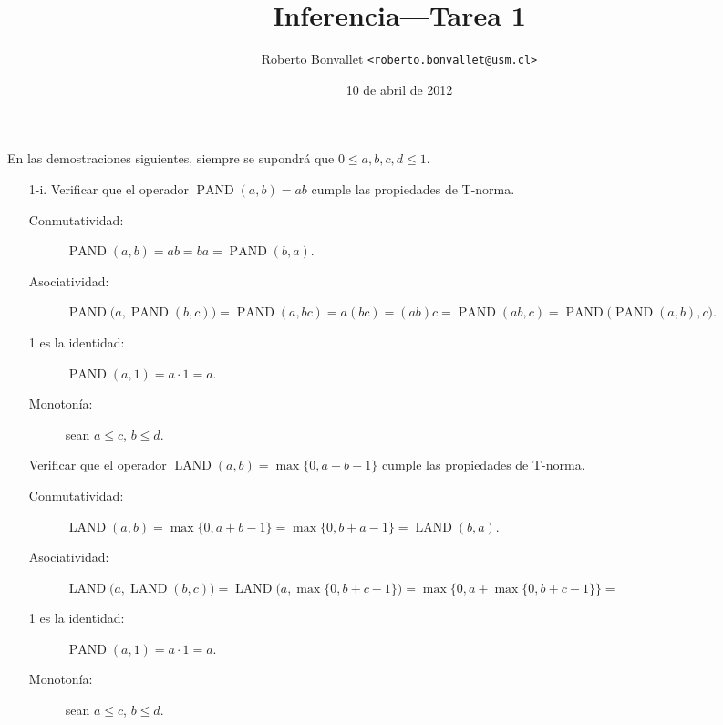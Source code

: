 \documentclass{article}
\title{Inferencia---Tarea 1}
\author{Roberto Bonvallet \texttt{<roberto.bonvallet@usm.cl>}}
\date{10 de abril de 2012}
\DeclareMathOperator{\LAND}{LAND}
\DeclareMathOperator{\PAND}{PAND}
\begin{document}
\maketitle

En las demostraciones siguientes,
siempre se supondrá que
\(0\le a, b, c, d\le 1\).

\begin{enumerate}[
  label=\arabic*.,
  font=\LARGE\bfseries,%
  labelindent=-.5in,%
  leftmargin=0pt,%
  labelsep=1em%
]

  \item[1-i.]
    Verificar que el operador \(\PAND(a, b) = ab\)
    cumple las propiedades de T-norma.
    \begin{description}
      \item[Conmutatividad:]
        \(
          \PAND(a, b) =
          ab =
          ba =
          \PAND(b, a).
        \)
      \item[Asociatividad:]
        \(
          \PAND\bigl(a, \PAND(b, c)\bigr) =
          \PAND(a, bc) =
          a(bc) =
          (ab)c =
          \PAND(ab, c) =
          \PAND\bigl(\PAND(a, b), c\bigr).
        \)
      \item[1 es la identidad:]
        \(
          \PAND(a, 1) = a\cdot 1 = a.
        \)
      \item[Monotonía:] sean \(a\le c\), \(b\le d\).

    \end{description}

    Verificar que el operador \(\LAND(a, b) = \max\{0, a + b - 1\}\)
    cumple las propiedades de T-norma.
    \begin{description}
      \item[Conmutatividad:]
        \(
          \LAND(a, b) =
          \max\{0, a + b - 1\} =
          \max\{0, b + a - 1\} =
          \LAND(b, a).
        \)
      \item[Asociatividad:]
        \(
          \LAND\bigl(a, \LAND(b, c)\bigr) =
          \LAND\bigl(a, \max\{0, b + c - 1\}\bigr) =
          \max\bigl\{0, a + \max\{0, b + c - 1\}\bigl\} =
        \)
      \item[1 es la identidad:]
        \(
          \PAND(a, 1) = a\cdot 1 = a.
        \)
      \item[Monotonía:] sean \(a\le c\), \(b\le d\).

    \end{description}


\end{enumerate}
\end{document}
